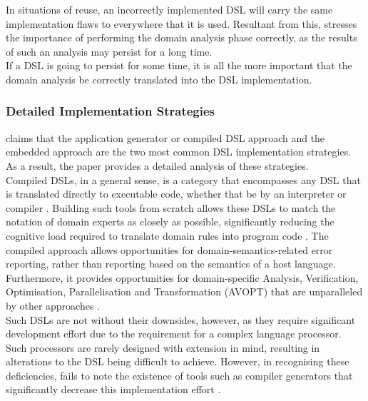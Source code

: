 \documentclass[a4paper,11pt]{report}
\begin{document}
In situations of reuse, an incorrectly implemented DSL will carry the same implementation flaws to everywhere that it is used.
Resultant from this, \citet{Mernik:2005:DDL:1118890.1118892} stresses the importance of performing the domain analysis phase correctly, as the results of such an analysis may persist for a long time. \\

If a DSL is going to persist for some time, it is all the more important that the domain analysis be correctly translated into the DSL implementation. 


\subsubsection{Detailed Implementation Strategies} %
\label{ssub:detailed_implementation_strategies}
\citet{Mernik:2005:DDL:1118890.1118892} claims that the application generator or compiled DSL approach and the embedded approach are the two most common DSL implementation strategies. 
As a result, the paper provides a detailed analysis of these strategies. \\

Compiled DSLs, in a general sense, is a category that encompasses any DSL that is translated directly to executable code, whether that be by an interpreter or compiler \citep{Mernik:2005:DDL:1118890.1118892}. 
Building such tools from scratch allows these DSLs to match the notation of domain experts as closely as possible, significantly reducing the cognitive load required to translate domain rules into program code \citep{fowler2010domain}.
The compiled approach allows opportunities for domain-semantics-related error reporting, rather than reporting based on the semantics of a host language.
Furthermore, it provides opportunities for domain-specific Analysis, Verification, Optimisation, Parallelisation and Transformation (AVOPT) that are unparalleled by other approaches \citep{Mernik:2005:DDL:1118890.1118892}.\\

Such DSLs are not without their downsides, however, as they require significant development effort due to the requirement for a complex language processor. 
Such processors are rarely designed with extension in mind, resulting in alterations to the DSL being difficult to achieve. 
However, in recognising these deficiencies, \citet{Mernik:2005:DDL:1118890.1118892} fails to note the existence of tools such as compiler generators that significantly decrease this implementation effort \citep{Mandell:1966:MDA:800267.810785}. \\
\end{document}
